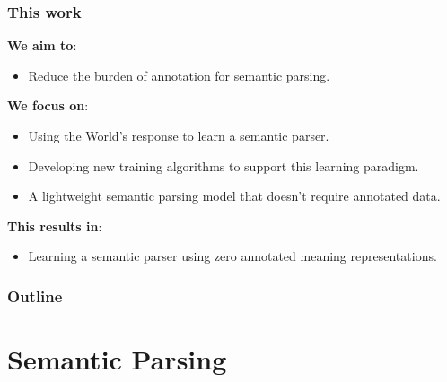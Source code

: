 \begin{frame}
\frametitle{This work}

\textbf{We aim to}:
\begin{itemize}
\item Reduce the burden of annotation for semantic parsing.
\end{itemize}

\textbf{We focus on}:
\begin{itemize}
\item Using the World's response to learn a semantic parser.
\item Developing new training algorithms to support this learning paradigm.
\item A lightweight semantic parsing model that doesn't require annotated data.
\end{itemize}

\textbf{This results in}:
\begin{itemize}
\item Learning a semantic parser using \alert{zero annotated meaning representations}.
\end{itemize}


\end{frame}


\begin{frame}
  \frametitle{Outline}
  \tableofcontents
\end{frame}


\section{Semantic Parsing}


